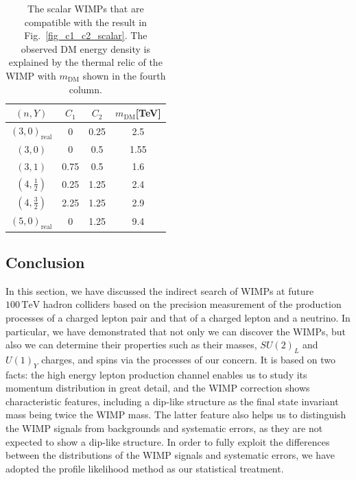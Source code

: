 \documentclass[12pt,twoside,book]{article}
\begin{document}
\begin{table}[t]
  \centering
  \begin{tabular}{|c|ccc|}
    \hline
    $(n, Y)$           & $C_1$ & $C_2$ & $m_\text{DM}$[TeV] \\ \hline\hline
    $(3,0)_\text{real}$  &    0  &  0.25  & 2.5 \cite{Farina:2013mla}             \\
    $(3,          0)$  &    0  & 0.5   & 1.55 \cite{DelNobile:2015bqo}              \\
    $(3,          1)$  & 0.75  & 0.5   & 1.6 \cite{Farina:2013mla}               \\
    $(4,\frac{1}{2})$  & 0.25  & 1.25  & 2.4 \cite{Farina:2013mla}             \\
    $(4,\frac{3}{2})$  & 2.25  & 1.25  & 2.9 \cite{Farina:2013mla}             \\
    $(5,0)_\text{real}$  &    0  &  1.25  & 9.4 \cite{Farina:2013mla}          \\
    \hline
  \end{tabular}
  \caption{
    The scalar WIMPs that are compatible with the result in Fig.~\ref{fig_c1_c2_scalar}. The observed DM energy density is explained by the thermal relic of the WIMP with $m_{\text{DM}}$ shown in the fourth column.
  }
  \label{tab:minimalDM-for-950scalar-section}
\end{table}


\subsection{Conclusion}
\label{seq:conclusion}

In this section, we have discussed the indirect search of WIMPs at future $100\,\mathrm{TeV}$ hadron colliders based on the precision measurement of the production processes of a charged lepton pair and that of a charged lepton and a neutrino.
In particular, we have demonstrated that not only we can discover the WIMPs, but also we can determine their properties such as their masses, $SU(2)_L$ and $U(1)_Y$ charges, and  spins via the processes of our concern.
It is based on two facts: the high energy lepton production channel enables us to study its momentum distribution in great detail, and the WIMP correction shows characteristic features, including a dip-like structure as the final state invariant mass being twice the WIMP mass.
The latter feature also helps us to distinguish the WIMP signals from backgrounds and systematic errors, as they are not expected to show a dip-like structure.
In order to fully exploit the differences between the distributions of the WIMP signals and systematic errors, we have adopted the profile likelihood method as our statistical treatment.
\end{document}
